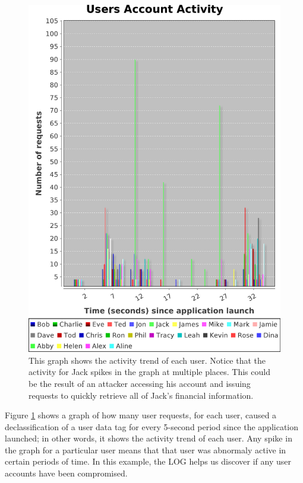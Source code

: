 \begin{figure}
\centering
\includegraphics[width=\textwidth,height=\textheight,keepaspectratio]{figures/activity}
\caption[Mint User Activity Trend]{This graph shows the activity trend of each user. Notice that the activity for Jack spikes in the graph at multiple places. This could be the result of an attacker accessing his account and issuing requests to quickly retrieve all of Jack's financial information.}
\label{fig:user-activity}
\end{figure}

Figure \ref{fig:user-activity} shows a graph of how many user requests, for each user, caused a declassification of a user data tag for every 5-second period since the application launched; in other words, it shows the activity trend of each user. Any spike in the graph for a particular user means that that user was abnormaly active in certain periods of time. In this example, the LOG helps us discover if any user accounts have been compromised.

